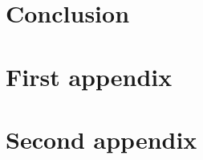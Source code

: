 \documentclass[12pt]{article}
\begin{document}
\section{Conclusion}

\lipsum[1]




\appendix  
\clearpage
\addappheadtotoc 
\appendixpage 

\section{First appendix}

\lipsum[1]

\section{Second appendix}

\lipsum[1]
\end{document}
